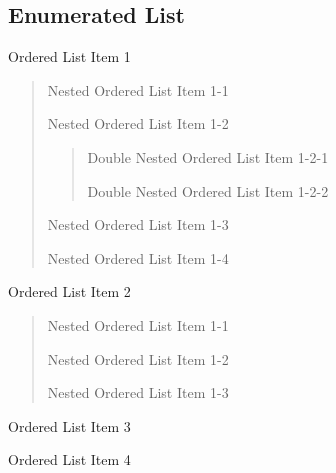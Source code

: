 \documentclass{book}
\begin{document}
\subsection{Enumerated List%
  \label{enumerated-list}%
}
\begin{list}{.}
{
\setlength{\rightmargin}{\leftmargin}
}

\item Ordered List Item 1
%
\begin{quote}
\begin{list}{()}
{
\setlength{\rightmargin}{\leftmargin}
}

\item Nested Ordered List Item 1-1

\item Nested Ordered List Item 1-2
%
\begin{quote}
\begin{list}{)}
{
\setlength{\rightmargin}{\leftmargin}
}

\item Double Nested Ordered List Item 1-2-1

\item Double Nested Ordered List Item 1-2-2
\end{list}

\end{quote}

\item Nested Ordered List Item 1-3

\item Nested Ordered List Item 1-4
\end{list}

\end{quote}

\item Ordered List Item 2
%
\begin{quote}
\setcounter{listcnt1}{0}
\begin{list}{()}
{
\setlength{\rightmargin}{\leftmargin}
}

\item Nested Ordered List Item 1-1

\item Nested Ordered List Item 1-2

\item Nested Ordered List Item 1-3
\end{list}

\end{quote}

\item Ordered List Item 3

\item Ordered List Item 4
\end{list}
\end{document}
